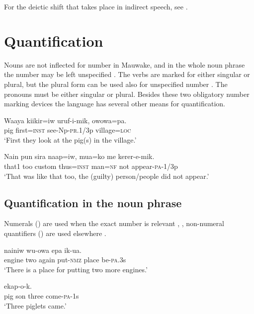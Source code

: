 For the deictic shift that takes place in indirect speech, see .

\section{Quantification}

Nouns are not inflected for number in Mauwake, and in the whole noun phrase the number may be left unspecified . The verbs are marked for either singular or plural, but the plural form can be used also for unspecified number . The pronouns must be either singular or plural. Besides these two obligatory number marking devices the language has several other means for quantification.

\ea%
\label{ex:6:x1284}
\gll Waaya  kiikir=iw  uruf-i-mik,  owowa=pa. \\
pig  first=\textsc{inst}  see-Np-\textsc{pr}.1/3p  village=\textsc{loc} \\
\glt `First they look at the pig(s) in the village.'
\z

\ea%
\label{ex:6:x1285}
\gll Nain  pun  sira  naap=iw,  mua=ko  me  kerer-e-mik. \\
that1  too  custom  thus=\textsc{inst}  man=\textsc{nf}  not  appear-\textsc{pa}-1/3p\\
\glt `That was like that too, the (guilty) person/people did not appear.'
\z

\subsection{Quantification in the noun phrase}

Numerals () are used when the exact number is relevant , , non-numeral quantifiers () are used elsewhere .  

\ea%
\label{ex:6:x1286}
\gll {}   nainiw  wu-owa  epa  ik-ua. \\
engine  two  again  put-\textsc{nmz}  place  be-\textsc{pa}.3s\\
\glt `There is a place for putting two more engines.'
\z

\ea%
\label{ex:6:x1308}
\gll {}     ekap-o-k. \\
pig  son  three  come-\textsc{pa}-1s\\
\glt `Three piglets came.'
\z

